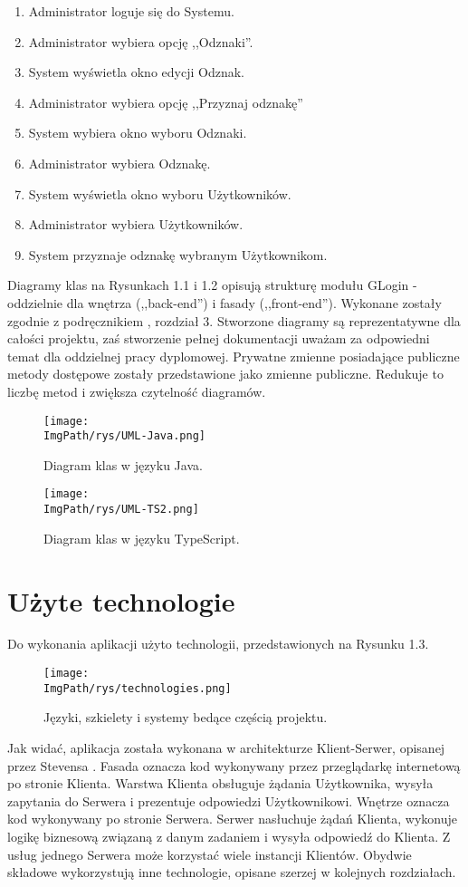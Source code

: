 \documentclass[a4paper,12pt,twoside,openany]{report}
\newcommand{\ImgPath}{.}
\begin{document}
	\begin{enumerate}
		\item Administrator loguje się do Systemu.
		\item Administrator wybiera opcję ,,Odznaki''.
		\item System wyświetla okno edycji Odznak.
		\item Administrator wybiera opcję ,,Przyznaj odznakę''
		\item System wybiera okno wyboru Odznaki.
		\item Administrator wybiera Odznakę.
		\item System wyświetla okno wyboru Użytkowników.
		\item Administrator wybiera Użytkowników.
		\item System przyznaje odznakę wybranym Użytkownikom.
	\end{enumerate}
	Diagramy klas na Rysunkach 1.1 i 1.2 opisują strukturę modułu GLogin - oddzielnie dla wnętrza (,,back-end'') i fasady (,,front-end''). Wykonane zostały zgodnie z podręcznikiem \cite{Smialek}, rozdział 3. Stworzone diagramy są reprezentatywne dla całości projektu, zaś stworzenie pełnej dokumentacji uważam za odpowiedni temat dla oddzielnej pracy dyplomowej. Prywatne zmienne posiadające publiczne metody dostępowe zostały przedstawione jako zmienne publiczne. Redukuje to liczbę metod i zwiększa czytelność diagramów.
	\begin{sidewaysfigure}[!htbp]

			\texttt{[image: \\ImgPath/rys/UML-Java.png]}

		\caption{Diagram klas w języku Java.}
		\label{UMLJava}
	\end{sidewaysfigure}
		\begin{sidewaysfigure}[!htbp]

				\texttt{[image: \\ImgPath/rys/UML-TS2.png]}

			\caption{Diagram klas w języku TypeScript.}
			\label{UMLTS}
		\end{sidewaysfigure}
\section{Użyte technologie}
Do wykonania aplikacji użyto technologii, przedstawionych na Rysunku 1.3.
	\begin{figure}[!htbp]
		\begin{center}
			\centering
			\texttt{[image: \\ImgPath/rys/technologies.png]}
		\end{center}
		\caption{Języki, szkielety i systemy bedące częścią projektu.}
		\label{technologies}
	\end{figure}
Jak widać, aplikacja została wykonana w architekturze Klient-Serwer, opisanej  przez Stevensa \cite{Stevens}. Fasada oznacza kod wykonywany przez przeglądarkę internetową po stronie Klienta. Warstwa Klienta obsługuje żądania Użytkownika, wysyła zapytania do Serwera i prezentuje odpowiedzi Użytkownikowi. Wnętrze oznacza kod wykonywany po stronie Serwera. Serwer nasłuchuje żądań Klienta, wykonuje logikę biznesową związaną z danym zadaniem i wysyła odpowiedź do Klienta. Z usług jednego Serwera może korzystać wiele instancji Klientów. Obydwie składowe wykorzystują inne technologie, opisane szerzej w kolejnych rozdziałach.
\end{document}
